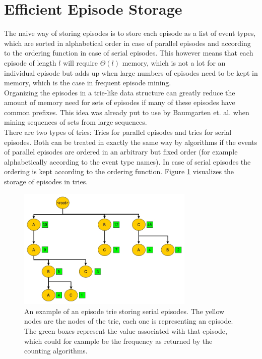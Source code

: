 \section{Efficient Episode Storage}
\label{sec_episodeTrie}
The naive way of storing episodes is to store each episode as a list of event types, which are sorted in alphabetical order in case of parallel episodes and according to the ordering function in case of serial episodes. This however means that each episode of length $l$ will require $\Theta(l)$ memory, which is not a lot for an individual episode but adds up when large numbers of episodes need to be kept in memory, which is the case in frequent episode mining. \\
Organizing the episodes in a trie-like data structure can greatly reduce the amount of memory need for sets of episodes if many of these episodes have common prefixes. This idea was already put to use by Baumgarten et. al. \cite{baumgarten2003tree} when mining sequences of sets from large sequences. \\
There are two types of tries: Tries for parallel episodes and tries for serial episodes. Both can be treated in exactly the same way by algorithms if the events of parallel episodes are ordered in an arbitrary but fixed order (for example alphabetically according to the event type names). In case of serial episodes the ordering is kept according to the ordering function. Figure \ref{fig_trieExample} visualizes the storage of episodes in tries. 
\begin{figure}[h]
	\centering
  	\includegraphics[width=0.75\textwidth]{trieExample}
	\caption{An example of an episode trie storing serial episodes. The yellow nodes are the nodes of the trie, each one is representing an episode. The green boxes represent the value associated with that episode, which could for example be the frequency as returned by the counting algorithms.}
	\label{fig_trieExample}
\end{figure}

